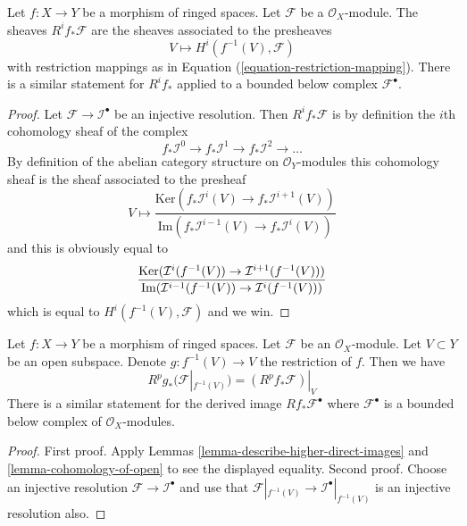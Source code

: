 \begin{lemma}
\label{lemma-describe-higher-direct-images}
Let $f : X \to Y$ be a morphism of ringed spaces.
Let $\mathcal{F}$ be a $\mathcal{O}_X$-module.
The sheaves $R^if_*\mathcal{F}$ are the sheaves
associated to the presheaves
$$
V \longmapsto H^i(f^{-1}(V), \mathcal{F})
$$
with restriction mappings as in Equation (\ref{equation-restriction-mapping}).
There is a similar statement for $R^if_*$ applied to a
bounded below complex $\mathcal{F}^\bullet$.
\end{lemma}

\begin{proof}
Let $\mathcal{F} \to \mathcal{I}^\bullet$ be an injective resolution.
Then $R^if_*\mathcal{F}$ is by definition the $i$th cohomology sheaf
of the complex
$$
f_*\mathcal{I}^0 \to f_*\mathcal{I}^1 \to f_*\mathcal{I}^2 \to \ldots
$$
By definition of the abelian category structure on $\mathcal{O}_Y$-modules
this cohomology sheaf is the sheaf associated to the presheaf
$$
V
\longmapsto
\frac{\text{Ker}(f_*\mathcal{I}^i(V) \to f_*\mathcal{I}^{i + 1}(V))}
{\text{Im}(f_*\mathcal{I}^{i - 1}(V) \to f_*\mathcal{I}^i(V))}
$$
and this is obviously equal to
$$
\frac{\text{Ker}(\mathcal{I}^i(f^{-1}(V)) \to \mathcal{I}^{i + 1}(f^{-1}(V)))}
{\text{Im}(\mathcal{I}^{i - 1}(f^{-1}(V)) \to \mathcal{I}^i(f^{-1}(V)))} \\
$$
which is equal to $H^i(f^{-1}(V), \mathcal{F})$
and we win.
\end{proof}

\begin{lemma}
\label{lemma-localize-higher-direct-images}
Let $f : X \to Y$ be a morphism of ringed spaces.
Let $\mathcal{F}$ be an $\mathcal{O}_X$-module.
Let $V \subset Y$ be an open subspace.
Denote $g : f^{-1}(V) \to V$ the restriction of $f$.
Then we have
$$
R^pg_*(\mathcal{F}|_{f^{-1}(V)}) = (R^pf_*\mathcal{F})|_V
$$
There is a similar statement for the
derived image $Rf_*\mathcal{F}^\bullet$ where $\mathcal{F}^\bullet$
is a bounded below complex of $\mathcal{O}_X$-modules.
\end{lemma}

\begin{proof}
First proof. Apply Lemmas \ref{lemma-describe-higher-direct-images}
and \ref{lemma-cohomology-of-open} to see the displayed equality.
Second proof. Choose an injective resolution
$\mathcal{F} \to \mathcal{I}^\bullet$
and use that $\mathcal{F}|_{f^{-1}(V)} \to \mathcal{I}^\bullet|_{f^{-1}(V)}$
is an injective resolution also.
\end{proof}

